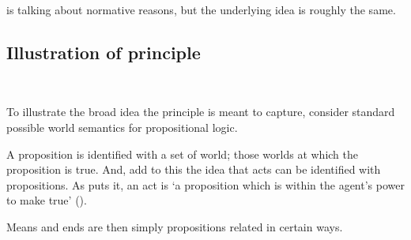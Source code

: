 \documentclass[10pt]{article}
\newcommand{\hozline}[0]{%
  \noindent\hdashrule[0.5ex][c]{\textwidth}{.1pt}{}
}
\begin{document}
\citeauthor{Raz:2005aa} is talking about normative reasons, but the underlying idea is roughly the same.

\hozline

\subsection*{Illustration of principle}\mbox{ }

To illustrate the broad idea the principle is meant to capture, consider standard possible world semantics for propositional logic.

A proposition is identified with a set of world; those worlds at which the proposition is true.
And, add to this the idea that acts can be identified with propositions.
As \citeauthor{Jeffrey:1990aa} puts it, an act is `a proposition which is within the agent's power to make true' (\citeyear[84]{Jeffrey:1990aa}).

Means and ends are then simply propositions related in certain ways.
\end{document}
